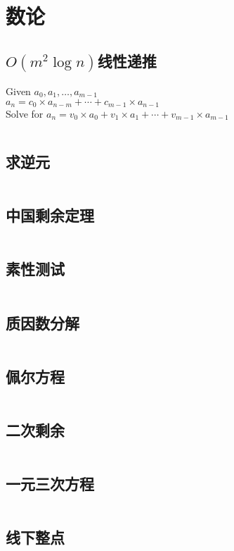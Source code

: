 \chapter{数论}
\section{$O(m^2\log n)$线性递推}
Given $a_0, a_1, \ldots, a_{m - 1}$\\
	$a_n = c_0 \times a_{n - m} + \cdots + c_{m - 1} \times a_{n - 1}$\\
	Solve for $a_n = v_0 \times a_0 + v_1 \times a_1 + \cdots + v_{m - 1} \times a_{m - 1}$\\
\inputminted{cpp}{\source/number-theory/linear-recurrence.cpp}
\section{求逆元}
\inputminted{cpp}{\source/number-theory/get-inversion.cpp}
\section{中国剩余定理}
\inputminted{cpp}{\source/number-theory/chinese-remainder-theorem.cpp}
\section{素性测试}
\inputminted{cpp}{\source/number-theory/primality-test.cpp}
\section{质因数分解}
\inputminted{cpp}{\source/number-theory/pollards-rho-algorithm.cpp}
\section{佩尔方程}
\inputminted{java}{\source/number-theory/Pell.java}
\section{二次剩余}
\inputminted{cpp}{\source/number-theory/square.cpp}
\section{一元三次方程}
\inputminted{cpp}{\source/number-theory/cubic-polynomial.cpp}
\section{线下整点}
\inputminted{cpp}{\source/number-theory/integer-lattice-under-segment.cpp}
